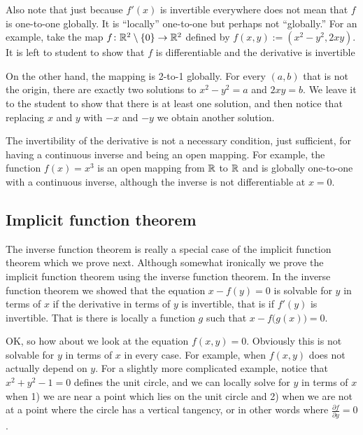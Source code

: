 \begin{example}
Also note that just because $f'(x)$ is invertible everywhere does not
mean that $f$ is
one-to-one globally.  It is ``locally'' one-to-one but perhaps not
``globally.''  For an
example, take the map $f \colon {\mathbb{R}}^2 \setminus \{ 0 \} \to {\mathbb{R}}^2$ defined
by $f(x,y) := (x^2-y^2,2xy)$.
It is left to student to show that $f$ is
differentiable and the derivative is invertible

On the other hand, the mapping is 2-to-1 globally.  For every
$(a,b)$ that is not the origin, there are exactly two
solutions to $x^2-y^2=a$ and $2xy=b$.  We leave it to the student
to show that there is at least one solution, and then notice
that replacing $x$ and $y$ with $-x$ and $-y$ we obtain another solution.
\end{example}

The invertibility of the derivative is not a necessary
condition, just sufficient, for having a continuous inverse and being an open
mapping.  For example, the function $f(x) = x^3$ is an open mapping from ${\mathbb{R}}$
to ${\mathbb{R}}$ and is globally one-to-one with a continuous inverse, although the
inverse is not differentiable at $x=0$.

\subsection{Implicit function theorem}

The inverse function theorem is really a special case of the implicit
function theorem which we prove next.  Although somewhat ironically we 
prove the implicit function theorem using the inverse function theorem.
In the inverse function theorem we showed that
the equation $x-f(y) = 0$ is solvable for $y$ in terms of $x$ if the derivative
in terms of $y$ is invertible, that is if $f'(y)$ is invertible.
That is there is locally a
function $g$ such that $x-f\bigl(g(x)\bigr) = 0$.

OK, so how about we look at the equation $f(x,y) = 0$.  Obviously this is
not solvable for $y$ in terms of $x$ in every case.  For example,
when $f(x,y)$ does not actually depend on $y$.  For a slightly more
complicated example, notice that $x^2+y^2-1 = 0$ defines the unit circle, and
we can locally solve for $y$ in terms of $x$ when 1) we are near
a point which lies on the unit circle and 2) when we are not at a point
where the circle has a vertical tangency, or in other words where
$\frac{\partial f}{\partial y} = 0$.

